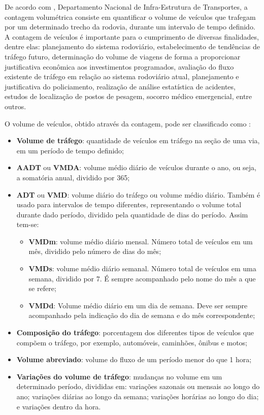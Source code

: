
De acordo com \cite{dnit:2011:online}, Departamento Nacional de Infra-Estrutura de Transportes, a contagem volumétrica consiste em quantificar o volume de veículos que trafegam por um determinado trecho da rodovia, durante um intervalo de tempo definido. A contagem de veículos é importante para o cumprimento de diversas finalidades, dentre elas: planejamento do sistema rodoviário, estabelecimento de tendências de tráfego futuro, determinação do volume de viagens de forma a proporcionar justificativa econômica aos investimentos programados, avaliação do fluxo existente de tráfego em relação ao sistema rodoviário atual, planejamento e justificativa do policiamento, realização de análise estatística de acidentes, estudos de localização de postos de pesagem, socorro médico emergencial, entre outros.

O volume de veículos, obtido através da contagem, pode ser classificado como \citep{goldner:2009:misc}:

\begin{itemize}
  \item \textbf{Volume de tráfego}: quantidade de veículos em tráfego na seção de uma via, em um período de tempo definido;
  \item \textbf{AADT} ou \textbf{VMDA}: volume médio diário de veículos durante o ano, ou seja, a somatória anual, dividido por 365;
  \item \textbf{ADT} ou \textbf{VMD}: volume diário do tráfego ou volume médio diário. Também é usado para intervalos de tempo diferentes, representando o volume total durante dado período, dividido pela quantidade de dias do período. Assim tem-se:
  \begin{itemize}
    \item \textbf{VMDm}: volume médio diário mensal. Número total de veículos em um mês, dividido pelo número de dias do mês;
    \item \textbf{VMDs}: volume médio diário semanal. Número total de veículos em uma semana, dividido por 7. É sempre acompanhado pelo nome do mês a que se refere;
    \item \textbf{VMDd}: Volume médio diário em um dia de semana. Deve ser sempre acompanhado pela indicação do dia de semana e do mês correspondente;
  \end{itemize}
  \item \textbf{Composição do tráfego}: porcentagem dos diferentes tipos de veículos que compõem o tráfego, por exemplo, automóveis, caminhões, ônibus e motos;
  \item \textbf{Volume abreviado}: volume do fluxo de um período menor do que 1 hora;
  \item \textbf{Variações do volume de tráfego}: mudanças no volume em um determinado período, divididas em: variações sazonais ou mensais ao longo do ano; variações diárias ao longo da semana; variações horárias ao longo do dia; e variações dentro da hora.
\end{itemize}

